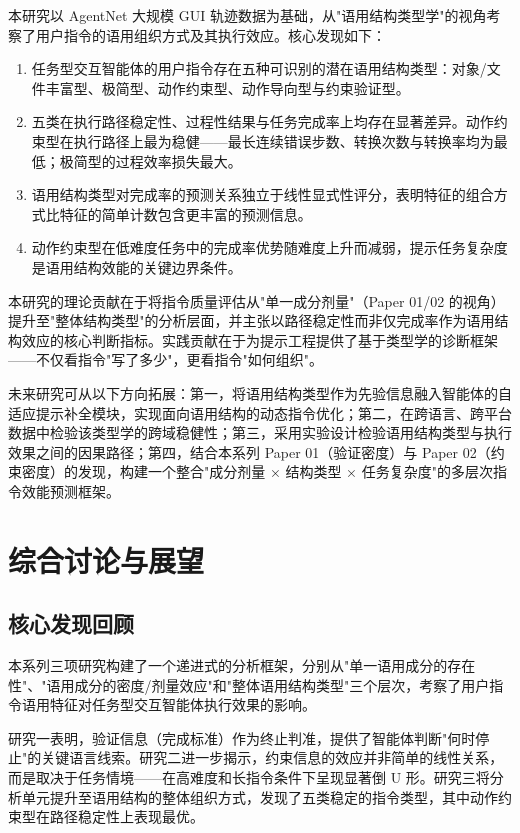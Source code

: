 \documentclass[12pt,a4paper,openany,oneside]{ctexrep}
\begin{document}
本研究以 AgentNet 大规模 GUI 轨迹数据为基础，从"语用结构类型学"的视角考察了用户指令的语用组织方式及其执行效应。核心发现如下：

\begin{enumerate}
\item[1.] 任务型交互智能体的用户指令存在五种可识别的潜在语用结构类型：对象/文件丰富型、极简型、动作约束型、动作导向型与约束验证型。
\item[2.] 五类在执行路径稳定性、过程性结果与任务完成率上均存在显著差异。动作约束型在执行路径上最为稳健——最长连续错误步数、转换次数与转换率均为最低；极简型的过程效率损失最大。
\item[3.] 语用结构类型对完成率的预测关系独立于线性显式性评分，表明特征的组合方式比特征的简单计数包含更丰富的预测信息。
\item[4.] 动作约束型在低难度任务中的完成率优势随难度上升而减弱，提示任务复杂度是语用结构效能的关键边界条件。
\end{enumerate}


本研究的理论贡献在于将指令质量评估从"单一成分剂量"（Paper 01/02 的视角）提升至"整体结构类型"的分析层面，并主张以路径稳定性而非仅完成率作为语用结构效应的核心判断指标。实践贡献在于为提示工程提供了基于类型学的诊断框架——不仅看指令"写了多少"，更看指令"如何组织"。

未来研究可从以下方向拓展：第一，将语用结构类型作为先验信息融入智能体的自适应提示补全模块，实现面向语用结构的动态指令优化；第二，在跨语言、跨平台数据中检验该类型学的跨域稳健性；第三，采用实验设计检验语用结构类型与执行效果之间的因果路径；第四，结合本系列 Paper 01（验证密度）与 Paper 02（约束密度）的发现，构建一个整合"成分剂量 × 结构类型 × 任务复杂度"的多层次指令效能预测框架。


\newpage

\chapter{综合讨论与展望}


\section{核心发现回顾}


本系列三项研究构建了一个递进式的分析框架，分别从"单一语用成分的存在性"、"语用成分的密度/剂量效应"和"整体语用结构类型"三个层次，考察了用户指令语用特征对任务型交互智能体执行效果的影响。

研究一表明，验证信息（完成标准）作为终止判准，提供了智能体判断"何时停止"的关键语言线索。研究二进一步揭示，约束信息的效应并非简单的线性关系，而是取决于任务情境——在高难度和长指令条件下呈现显著倒 U 形。研究三将分析单元提升至语用结构的整体组织方式，发现了五类稳定的指令类型，其中动作约束型在路径稳定性上表现最优。
\end{document}
